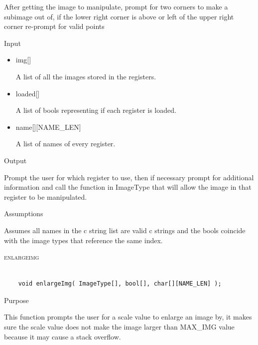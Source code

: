 \documentclass[pdftex, 11pt]{article}
\begin{document}
\begin{description}
\begin{description}
				After getting the image to manipulate, prompt for two corners to make a
				subimage out of, if the lower right corner is above or left of the upper
				right corner re-prompt for valid points

			\item{Input}

				\begin{itemize}

					\item{img[]}

						A list of all the images stored in the registers.

					\item{loaded[]}

						A list of bools representing if each register is loaded.

					\item{name[][NAME\_LEN]}

						A list of names of every register.

				\end{itemize}

			\item{Output}

				Prompt the user for which register to use, then if necessary
				prompt for additional information and call the function
				in ImageType that will allow the image in that register to
				be manipulated.

			\item{Assumptions}

				Assumes all names in the c string list are valid c
				strings and the bools coincide with the image types that
				reference the same index.

		\end{description}



	\item{\textsc{enlargeimg}}

		\begin{lstlisting}

	void enlargeImg( ImageType[], bool[], char[][NAME_LEN] );
		\end{lstlisting}

		\begin{description}
			\item{Purpose}

				This function prompts the user for a scale value to enlarge an image by, it
				makes sure the scale value does not make the image larger than MAX\_IMG value
				because it may cause a stack overflow.


\end{description}
\end{description}
\end{document}
